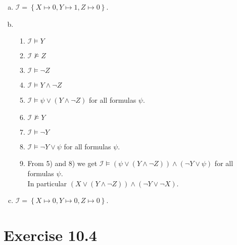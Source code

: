 \documentclass{article} %
\newcommand{\homeworkNumber}{10}
\begin{document}
\begin{enumerate}[(a)]
	\item
	\( \mathcal I = \left\{ X \mapsto 0, Y \mapsto 1, Z \mapsto 0 \right\}  \).
	\item
	\begin{enumerate}[1)]
		\item $\mathcal I \models Y$
		\item $\mathcal I \not\models Z$
		\item $\mathcal I \models \neg Z$
		\item $\mathcal I \models Y \land \neg Z $ 
		\item $\mathcal I \models  \psi \lor (Y \land \neg Z)$ for all formulas $\psi$.
		\item $\mathcal I \not\models Y$
		\item $\mathcal I \models \neg Y$
		\item $\mathcal I \models \neg Y \lor \psi$ for all formulas $\psi$.
		\item From 5) and 8) we get $\mathcal I \models  (\psi \lor (Y \land \neg Z)) \land (\neg Y \lor \psi)$ for all formulas $\psi$. \\
		In particular $(X \lor (Y \land \neg Z)) \land (\neg Y \lor \neg X)$.
	\end{enumerate}
	\item 
	\( \mathcal I = \left\{ X \mapsto 0, Y \mapsto 0, Z \mapsto 0 \right\}  \).

\end{enumerate}



\section*{Exercise \homeworkNumber.4}
\end{document}
